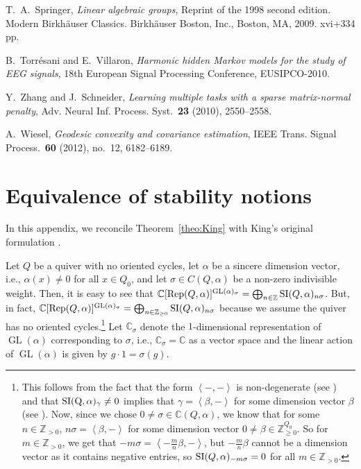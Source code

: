 \documentclass[11pt]{amsart}
\theoremstyle{definition}
\newcommand{\Rep}{{\rm Rep}}
\newcommand{\SI}{{\rm SI}}
\newcommand{\C}{{\mathbb C}}
\newcommand{\Z}{{\mathbb Z}}
\newcommand{\GL}{\operatorname{GL}}
\begin{document}
\begin{thebibliography}{99}
 T.~A.~Springer, {\it Linear algebraic groups}, Reprint of the 1998 second edition. Modern Birkhäuser Classics. Birkhäuser Boston, Inc., Boston, MA, 2009. xvi+334 pp.


 B.~Torrésani and E.~Villaron, {\it Harmonic hidden Markov models for the study of EEG signals}, 18th European Signal Processing Conference, EUSIPCO-2010.



 Y.~Zhang and J.~Schneider, {\it Learning multiple tasks with a sparse matrix-normal penalty}, Adv. Neural Inf. Process. Syst.~{\bf 23} (2010), 2550--2558.

 A.~Wiesel, {\it Geodesic convexity and covariance estimation}, IEEE Trans. Signal Process.~{\bf 60} (2012), no.~12, 6182--6189.

\end{thebibliography}



\appendix
\section{Equivalence of stability notions} \label{App.stability}

In this appendix, we reconcile Theorem~\ref{theo:King} with King's original formulation \cite{King}. 

Let $Q$ be a quiver with no oriented cycles, let $\alpha$ be a sincere dimension vector, i.e., $\alpha(x) \neq 0$ for all $x \in Q_0$, and let $\sigma \in C(Q,\alpha)$ be a non-zero indivisible weight. Then, it is easy to see that $\C[\Rep(Q,\alpha)]^{\GL(\alpha)_\sigma} = \bigoplus_{n \in \Z} \SI(Q,\alpha)_{n\sigma}$. But, in fact, $\C[\Rep(Q,\alpha)]^{\GL(\alpha)_\sigma} =  \bigoplus_{n \in \Z_{\geq 0}} \SI(Q,\alpha)_{n\sigma}$ because we assume the quiver has no oriented cycles.\footnote{This follows from the fact that the form $\left<-,-\right>$ is non-degenerate (see \cite[Definition~2.5.3]{DW-book}) and that $\rm SI(Q,\alpha)_\gamma \neq 0$ implies that $\gamma = \left<\beta,-\right>$ for some dimension vector $\beta$ (see \cite[Theorem~10.7.1]{DW-book}). Now, since we chose $0 \neq \sigma \in \C(Q,\alpha)$, we know that for some $n \in \Z_{> 0}$, $n\sigma = \left<\beta,-\right>$ for some dimension vector $0 \neq \beta \in \Z_{\geq 0}^{Q_0}$. So for $m \in \Z_{>0}$, we get that $-m\sigma = \left<- \frac{m}{n} \beta, - \right>$, but $- \frac{m}{n}\beta$ cannot be a dimension vector as it contains negative entries, so $\SI(Q,\alpha)_{-m\sigma} = 0$ for all $m \in \Z_{>0}$.} Let $\C_\sigma$ denote the $1$-dimensional representation of $\GL(\alpha)$ corresponding to $\sigma$, i.e., $\C_\sigma = \C$ as a vector space and the linear action of $\GL(\alpha)$ is given by $g \cdot 1 = \sigma(g)$.
\end{document}
